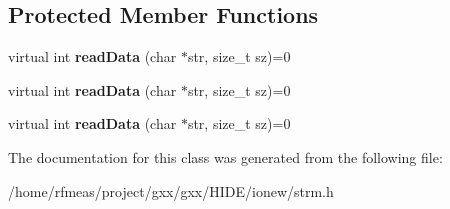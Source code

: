 \subsection*{Protected Member Functions}
\begin{DoxyCompactItemize}
\item 
virtual int {\bfseries read\+Data} (char $\ast$str, size\+\_\+t sz)=0\hypertarget{classgxx_1_1io_1_1strmin_a84094cdbd544b6213e6127634015cb65}{}\label{classgxx_1_1io_1_1strmin_a84094cdbd544b6213e6127634015cb65}

\item 
virtual int {\bfseries read\+Data} (char $\ast$str, size\+\_\+t sz)=0\hypertarget{classgxx_1_1io_1_1strmin_a84094cdbd544b6213e6127634015cb65}{}\label{classgxx_1_1io_1_1strmin_a84094cdbd544b6213e6127634015cb65}

\item 
virtual int {\bfseries read\+Data} (char $\ast$str, size\+\_\+t sz)=0\hypertarget{classgxx_1_1io_1_1strmin_a84094cdbd544b6213e6127634015cb65}{}\label{classgxx_1_1io_1_1strmin_a84094cdbd544b6213e6127634015cb65}

\end{DoxyCompactItemize}


The documentation for this class was generated from the following file\+:\begin{DoxyCompactItemize}
\item 
/home/rfmeas/project/gxx/gxx/\+H\+I\+D\+E/ionew/strm.\+h\end{DoxyCompactItemize}
